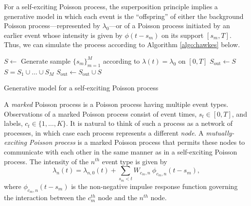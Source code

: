 		For a self-exciting Poisson process, the superposition principle implies a generative model in which each event is the ``offspring'' of either the background Poisson process---represented by $\lambda_0$---or of a Poisson process initiated by an earlier event whose intensity is given by $\phi(t-s_m)$ on its support $[s_m, T]$. Thus, we can simulate the process according to Algorithm \ref{algo:hawkes} below.

		\begin{algorithm}
				\begin{algorithmic}
					\vspace{1mm}
					\STATE $S \gets$ Generate sample $\{s_m\}_{m=1}^M$ according to $\lambda(t) = \lambda_0$ on $[0, T]$
					\STATE $S_{\text{out}} \gets S$
					\REPEAT
						\ENDFOR
					\STATE $S = S_1 \cup \dots \cup S_M$
					\STATE $S_{\text{out}} \gets S_{\text{out}} \cup S$
			\end{algorithmic}
			\caption{Generative model for a self-exciting Poisson process}
			\label{algo:hawkes}
		\end{algorithm}

		A \textit{marked} Poisson process is a Poisson process having multiple event types. Observations of a marked Poisson process consist of event times, $s_t \in [0, T]$, and labels, $c_t \in \{1, \dots, K\}$. It is natural to think of such a process as a network of processes, in which case each process represents a different \textit{node}. A \textit{mutually-exciting Poisson process} is a marked Poisson process that permits these nodes to communicate with each other in the same manner as in a self-exciting Poisson process. The intensity of the $n^{th}$ event type is given by
		\begin{equation} \label{eq:hawkes-intensity}
			\lambda_{n}(t) = \lambda_{n, 0}(t) + \sum_{s_m < t} W_{c_m, n} \ \phi_{c_m, n}(t-s_m),
		\end{equation}
		where $\phi_{c_m, n}(t-s_m)$ is the non-negative impulse response function governing the interaction between the $c_m^{th}$ node and the $n^{th}$ node.


